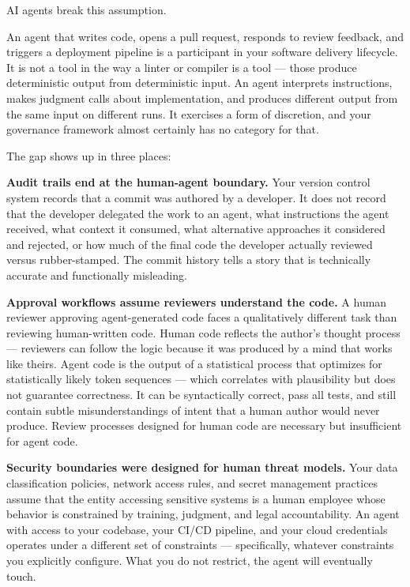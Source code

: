 \documentclass[
  a4paper,
  DIV=11,
  numbers=noendperiod]{scrreprt}
\begin{document}
AI agents break this assumption.

An agent that writes code, opens a pull request, responds to review
feedback, and triggers a deployment pipeline is a participant in your
software delivery lifecycle. It is not a tool in the way a linter or
compiler is a tool --- those produce deterministic output from
deterministic input. An agent interprets instructions, makes judgment
calls about implementation, and produces different output from the same
input on different runs. It exercises a form of discretion, and your
governance framework almost certainly has no category for that.

The gap shows up in three places:

\textbf{Audit trails end at the human-agent boundary.} Your version
control system records that a commit was authored by a developer. It
does not record that the developer delegated the work to an agent, what
instructions the agent received, what context it consumed, what
alternative approaches it considered and rejected, or how much of the
final code the developer actually reviewed versus rubber-stamped. The
commit history tells a story that is technically accurate and
functionally misleading.

\textbf{Approval workflows assume reviewers understand the code.} A
human reviewer approving agent-generated code faces a qualitatively
different task than reviewing human-written code. Human code reflects
the author's thought process --- reviewers can follow the logic because
it was produced by a mind that works like theirs. Agent code is the
output of a statistical process that optimizes for statistically likely
token sequences --- which correlates with plausibility but does not
guarantee correctness. It can be syntactically correct, pass all tests,
and still contain subtle misunderstandings of intent that a human author
would never produce. Review processes designed for human code are
necessary but insufficient for agent code.

\textbf{Security boundaries were designed for human threat models.} Your
data classification policies, network access rules, and secret
management practices assume that the entity accessing sensitive systems
is a human employee whose behavior is constrained by training, judgment,
and legal accountability. An agent with access to your codebase, your
CI/CD pipeline, and your cloud credentials operates under a different
set of constraints --- specifically, whatever constraints you explicitly
configure. What you do not restrict, the agent will eventually touch.
\end{document}
